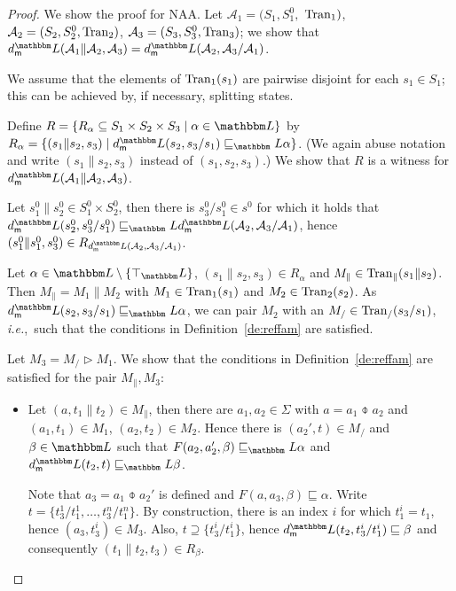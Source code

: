 \documentclass[twocolumn]{svjour3-dummy}
\newcommand*\ie{\textit{i.e.},}
\newcommand*\NAA{NAA\xspace}
\newcommand*\cA{\mathcal A}
\newcommand*\Tran{\textup{\textrm{Tran}}}
\newcommand*\by{/}
\newcommand*\LL{\mathbbm L}
\begin{document}
\begin{proof}\quad We show the proof for \NAA.  Let $\cA_1=( S_1, S^0_1,$ $\Tran_1)$,
  $\cA_2=( S_2, S^0_2, \Tran_2)$, $\cA_3=( S_3, S^0_3, \Tran_3)$; we
  show that $\mdl( \cA_1\| \cA_2, \cA_3)= \mdl( \cA_2, \cA_3\by \cA_1)$.

  We assume that the elements of $\Tran_1( s_1)$ are pairwise disjoint
  for each $s_1\in S_1$; this can be achieved by, if necessary,
  splitting states.

  Define $R=\{ R_\alpha\subseteq S_1\times S_2\times S_3\mid \alpha\in
  \LL\}$ by $R_\alpha=\{( s_1\| s_2, s_3)\mid \mdl( s_2, s_3\by
  s_1)\sqsubseteq_\LL \alpha\}$.  (We again abuse notation and write
  $( s_1\| s_2, s_3)$ instead of $( s_1, s_2, s_3)$.)  We show that
  $R$ is a witness for $\mdl( \cA_1\| \cA_2, \cA_3)$.

  Let $s_1^0\| s_2^0\in S_1^0\times S_2^0$, then there is $s_3^0\by
  s_1^0\in s^0$ for which it holds that $\mdl( s_2^0, s_3^0\by
  s_1^0)\sqsubseteq_\LL \mdl( \cA_2, \cA_3\by \cA_1)$, hence $( s_1^0\|
  s_1^0, s_3^0)\in R_{ \mdl( \cA_2, \cA_3\by \cA_1)}$.

  Let $\alpha\in \LL\setminus\{ \top_\LL\}$, $( s_1\| s_2, s_3)\in
  R_\alpha$ and $M_\|\in \Tran_\|( s_1\| s_2)$.  Then $M_\|= M_1\| M_2$
  with $M_1\in \Tran_1( s_1)$ and $M_2\in \Tran_2( s_2)$.  As $\mdl(
  s_2, s_3\by s_1)\sqsubseteq_\LL \alpha$, we can pair $M_2$ with an
  $M_\by\in \Tran_\by( s_3\by s_1)$, \ie~such that the conditions in
  Definition~\ref{de:reffam} are satisfied.

  Let $M_3= M_\by\triangleright M_1$.  We show that the conditions in
  Definition~\ref{de:reffam} are satisfied for the pair $M_\|, M_3$:
  \begin{itemize}
  \item Let $( a, t_1\| t_2)\in M_\|$, then there are $a_1, a_2\in
    \Sigma$ with $a= a_1\obar a_2$ and $( a_1, t_1)\in M_1$, $( a_2,
    t_2)\in M_2$.  Hence there is $( a_2', t)\in M_\by$ and $\beta\in
    \LL$ such that $F( a_2, a_2', \beta)\sqsubseteq_\LL \alpha$ and
    $\mdl( t_2, t)\sqsubseteq_\LL \beta$.

    Note that $a_3= a_1\obar a_2'$ is defined and $F( a, a_3,
    \beta)\sqsubseteq \alpha$.  Write $t=\{ t_3^1\by t_1^1,\dots,
    t_3^n\by t_1^n\}$.  By construction, there is an index $i$ for which
    $t_1^i= t_1$, hence $( a_3, t_3^i)\in M_3$.  Also, $t\supseteq\{
    t_3^i\by t_1^i\}$, hence $\mdl( t_2, t_3^i\by t_1^i)\sqsubseteq
    \beta$ and consequently $( t_1\| t_2, t_3)\in R_\beta$.


\end{itemize}
\end{proof}
\end{document}
